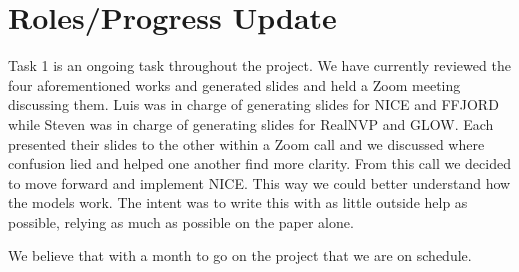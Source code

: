 \section{Roles/Progress Update}
Task 1 is an ongoing task throughout the project. We have currently reviewed the
four aforementioned works and generated slides and held a Zoom meeting
discussing them. Luis was in charge of generating slides for NICE and FFJORD
while Steven was in charge of generating slides for RealNVP and GLOW. Each
presented their slides to the other within a Zoom call and we discussed where
confusion lied and helped one another find more clarity. From this call we
decided to move forward and implement NICE. This way we could better understand
how the models work. The intent was to write this with as little outside help as
possible, relying as much as possible on the paper alone. 

We believe that with a month to go on the project that we are on schedule.
